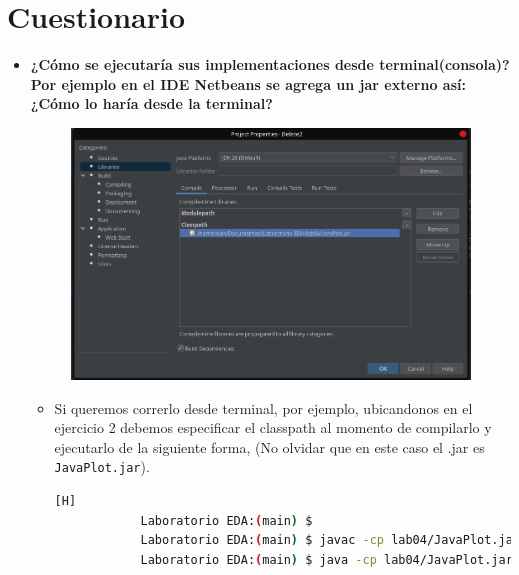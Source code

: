 \newpage
\section{Cuestionario} %
\begin{itemize}
	\item \textbf{¿Cómo se ejecutaría sus implementaciones desde terminal(consola)? Por ejemplo en el IDE Netbeans se agrega un jar externo así: ¿Cómo lo haría desde la terminal?}
	\begin{figure}[h!]
		\begin{center}
			\includegraphics[scale=0.4]{img/net.png}
		\end{center}
	\end{figure}
	
	\begin{itemize}
		\item Si queremos correrlo desde terminal, por ejemplo, ubicandonos en el ejercicio 2 debemos especificar el classpath al momento de compilarlo y ejecutarlo de la siguiente forma, (No olvidar que en este caso el .jar es \verb|JavaPlot.jar|).
		
		\begin{lstlisting}[language=bash, caption={caption}][H]
			Laboratorio EDA:(main) $
			Laboratorio EDA:(main) $ javac -cp lab04/JavaPlot.jar *.java
			Laboratorio EDA:(main) $ java -cp lab04/JavaPlot.jar:. Test
		\end{lstlisting}
	\end{itemize}
	
\end{itemize}
